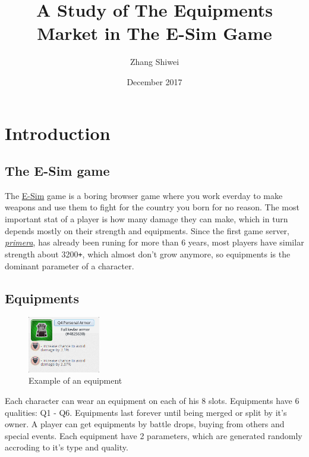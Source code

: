 \documentclass{manuscript}
\title{A Study of The Equipments Market in The E-Sim Game}
\author{Zhang Shiwei}
\date{December 2017}
\begin{document}
    \maketitle

    \section{Introduction}

    \subsection{The E-Sim game}

    The \href{https://www.e-sim.org}{E-Sim} game is a boring browser game where you work everday to make weapons and
    use them to fight for the country you born for no reason. The most important stat of a player is how many damage
    they can make, which in turn depends mostly on their strength and equipments. Since the first game server,
    \href{https://primera.e-sim.org}{\textit{primera}}, has already been runing for more than 6 years, most players have similar
    strength about 3200\verb!+!, which almost don't grow anymore, so equipments is the dominant parameter of a character.

    \subsection{Equipments}

    \begin{figure}
        \centering
        \vspace{-1\baselineskip}
        \includegraphics[width=0.28\textwidth]{equipment_example.png}
        \caption{Example of an equipment}\label{fig:eq_eg}
    \end{figure}

    Each character can wear an equipment on each of his 8 slots. Equipments have 6 qualities: Q1 - Q6. Equipments last
    forever until being merged or split by it's owner. A player can get equipments by battle drops, buying from others
    and special events. Each equipment have 2 parameters, which are generated randomly accroding to it's type and quality.
\end{document}
